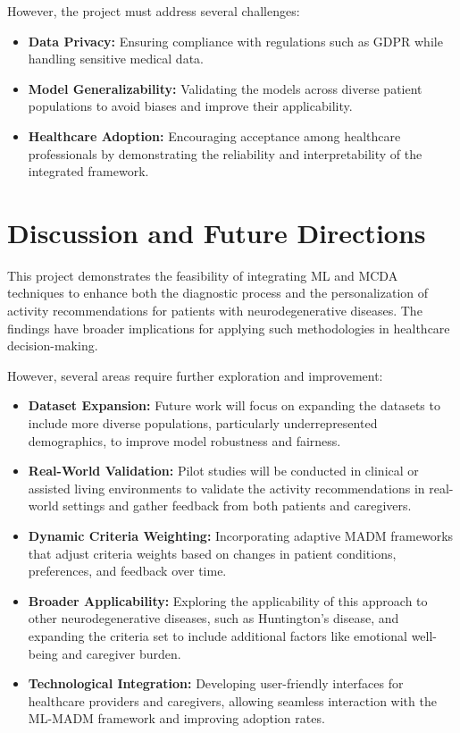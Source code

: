 \documentclass[conference]{IEEEtran}
\begin{document}
However, the project must address several challenges:
\begin{itemize}
    \item \textbf{Data Privacy:} Ensuring compliance with regulations such as GDPR while handling sensitive medical data.
    \item \textbf{Model Generalizability:} Validating the models across diverse patient populations to avoid biases and improve their applicability.
    \item \textbf{Healthcare Adoption:} Encouraging acceptance among healthcare professionals by demonstrating the reliability and interpretability of the integrated framework.
\end{itemize}

\section{Discussion and Future Directions}
This project demonstrates the feasibility of integrating ML and MCDA techniques to enhance both the diagnostic process and the personalization of activity recommendations for patients with neurodegenerative diseases. The findings have broader implications for applying such methodologies in healthcare decision-making. 

However, several areas require further exploration and improvement:
\begin{itemize}
    \item \textbf{Dataset Expansion:} Future work will focus on expanding the datasets to include more diverse populations, particularly underrepresented demographics, to improve model robustness and fairness.
    \item \textbf{Real-World Validation:} Pilot studies will be conducted in clinical or assisted living environments to validate the activity recommendations in real-world settings and gather feedback from both patients and caregivers.
    \item \textbf{Dynamic Criteria Weighting:} Incorporating adaptive MADM frameworks that adjust criteria weights based on changes in patient conditions, preferences, and feedback over time.
    \item \textbf{Broader Applicability:} Exploring the applicability of this approach to other neurodegenerative diseases, such as Huntington’s disease, and expanding the criteria set to include additional factors like emotional well-being and caregiver burden.
    \item \textbf{Technological Integration:} Developing user-friendly interfaces for healthcare providers and caregivers, allowing seamless interaction with the ML-MADM framework and improving adoption rates.
\end{itemize}
\end{document}
